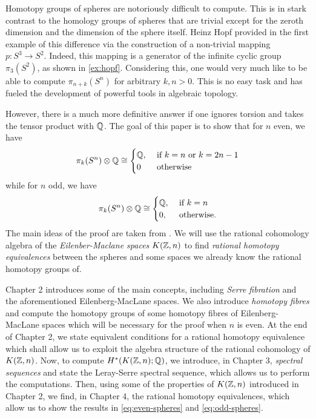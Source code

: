 \documentclass[../main.tex]{subfiles}
\begin{document}
Homotopy groups of spheres are notoriously difficult to compute. This is in
stark contrast to the homology groups of spheres that are trivial except
for the zeroth dimension and the dimension of the sphere itself.
Heinz Hopf provided in 
\cite[]{Hop31} the first example of this difference via the construction
of a non-trivial mapping \( p:S^3\rightarrow S^2 \).
Indeed, this mapping is a generator of the infinite cyclic group
\( \pi_3(S^2) \), as shown in \cref{ex:hopf}. Considering this, one would very much like to be able
to compute \( \pi_{n+k}(S^n) \) for arbitrary \( k,n>0 \). This is
no easy task and has fueled the development of powerful 
tools in algebraic topology.

However, there is a much more definitive answer if one ignores torsion and
takes the tensor product with \( \mathbb{Q} \). The goal of this paper is to
show that for \( n \) even, we have
\begin{equation}
    \label{eq:even-spheres}
    \pi_k(S^n)\otimes \mathbb{Q} \cong
    \begin{cases}
        \mathbb{Q}, &\text{ if }k=n \text{ or } k=2n-1\\
        0 & \text{ otherwise}
    \end{cases}
\end{equation}
while for \( n \) odd, we have
\begin{equation}
    \label{eq:odd-spheres}
    \pi_k(S^n)\otimes \mathbb{Q} \cong
    \begin{cases}
        \mathbb{Q}, &\text{ if }k=n\\
        0, &\text{ otherwise.}
    \end{cases}
\end{equation}
The main ideas of the proof are taken from \cite[]{Ber12}. We
will use the rational cohomology algebra of the \emph{Eilenber-Maclane
spaces}
 \( K(\mathbb{Z}, n) \) to find \emph{rational homotopy equivalences} between
 the spheres and some spaces we already know the rational homotopy
 groups of.  

Chapter 2 introduces some of the main concepts, including
\emph{Serre fibration} and the aforementioned Eilenberg-MacLane
spaces. We also introduce \emph{homotopy fibres} and compute the
homotopy groups of some homotopy fibres of Eilenberg-MacLane spaces which
will be necessary for the proof when \( n \) is even. At the end of
Chapter 2, we state equivalent conditions for a rational homotopy equivalence
which shall allow us to exploit the algebra structure of the rational
cohomology of \( K(\mathbb{Z}, n) \).
Now, to compute \( H^*(K(\mathbb{Z}, n);\mathbb{Q}) \), we introduce, in Chapter 3,
\emph{spectral sequences} and state the Leray-Serre spectral sequence,
which allows us to perform the computations. Then, using some
of the properties of \( K(\mathbb{Z}, n) \) introduced in Chapter 2, we find,
in Chapter 4, the rational homotopy equivalences, which allow
us to show the results in \cref{eq:even-spheres} and \cref{eq:odd-spheres}.
\end{document}
